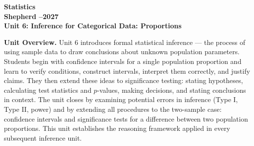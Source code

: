 \documentclass[10pt]{article}
\begin{document}
\vspace{-1.3in}

\begin{center}
  {\color{white}\bfseries\fontsize{28}{34}\selectfont Statistics}\\[8pt]
  {\color{goldacc}\bfseries\Large Shepherd --2027}\\[14pt]
  {\color{white}\bfseries\LARGE Unit 6: Inference for Categorical Data: Proportions}\\[4pt]
\end{center}

\vspace{0.30in}

\begin{tcolorbox}[colback=sky,colframe=navy,boxrule=0.9pt,arc=2mm,
    left=4mm,right=4mm,top=3mm,bottom=3mm]
  \textbf{Unit Overview.}\quad
  Unit 6 introduces formal statistical inference --- the process of using sample data to draw
  conclusions about unknown population parameters. Students begin with confidence intervals for
  a single population proportion and learn to verify conditions, construct intervals, interpret
  them correctly, and justify claims. They then extend these ideas to significance testing:
  stating hypotheses, calculating test statistics and $p$-values, making decisions, and stating
  conclusions in context. The unit closes by examining potential errors in inference (Type I,
  Type II, power) and by extending all procedures to the two-sample case: confidence intervals
  and significance tests for a difference between two population proportions. This unit establishes
  the reasoning framework applied in every subsequent inference unit.
\end{tcolorbox}

\vspace{0.22in}
\end{document}
